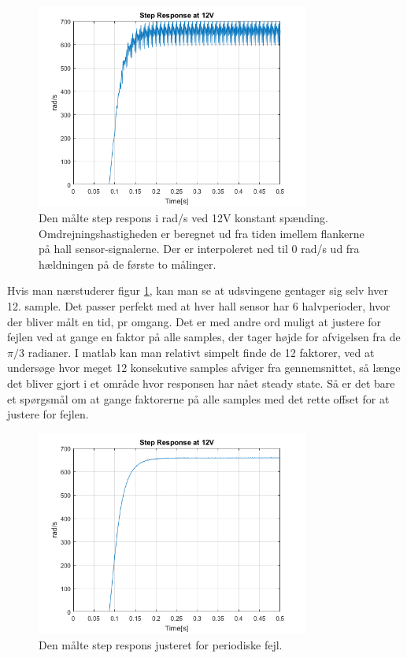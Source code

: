 \begin{figure}[!ht]
	\begin{center}
		\includegraphics[width=0.8\textwidth]{Billeder/Untreated_Response.png}
	\end{center}
\caption{Den målte step respons i rad/s ved 12V konstant spænding. Omdrejningshastigheden er beregnet ud fra tiden imellem flankerne på hall sensor-signalerne. Der er interpoleret ned til 0 rad/s ud fra hældningen på de første to målinger.}
\label{fig:Ubehandlet}
\end{figure}

Hvis man nærstuderer figur \ref{fig:Ubehandlet}, kan man se at udsvingene gentager sig selv hver 12. sample. Det passer perfekt med at hver hall sensor har 6 halvperioder, hvor der bliver målt en tid, pr omgang. Det er med andre ord muligt at justere for fejlen ved at gange en faktor på alle samples, der tager højde for afvigelsen fra de $\pi/3$ radianer. I matlab kan man relativt simpelt finde de 12 faktorer, ved at undersøge hvor meget 12 konsekutive samples afviger fra gennemsnittet, så længe det bliver gjort i et område hvor responsen har nået steady state. Så er det bare et spørgsmål om at gange faktorerne på alle samples med det rette offset for at justere for fejlen. 

\begin{figure}[!ht]
	\begin{center}
		\includegraphics[width=0.8\textwidth]{Billeder/Treated_Response.png}
	\end{center}
\caption{Den målte step respons justeret for periodiske fejl.}
\label{fig:Behandlet}
\end{figure}

